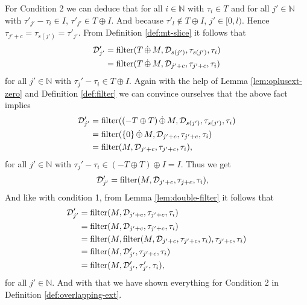 For Condition 2 we can deduce that for all $i \in \mathbb{N}$ with $\tau_i \in T$ and for all $j' \in \mathbb{N}$ with $\tau'_{j'} - \tau_i \in I$, $\tau'_{j'} \in T \oplus I$.
And because $\tau'_l \not\in T \oplus I$, $j' \in [0,l)$.
Hence $\tau_{j'+c} = \tau_{s(j')} = \tau'_{j'}$.
From Definition \ref{def:mt-slice} it follows that
\begin{align*}
    \mathcal{D}'_{j'}
    & = \operatorname{filter}(T \,\dot{\oplus}\, M, \mathcal{D}_{s(j')}, \tau_{s(j')}, \tau_i) \\
    & = \operatorname{filter}(T \,\dot{\oplus}\, M, \mathcal{D}_{j'+c}, \tau_{j'+c}, \tau_i) \\
\end{align*}
for all $j' \in \mathbb{N}$ with $\tau_j' - \tau_i \in T \oplus I$.
Again with the help of Lemma \ref{lem:oplusext-zero} and Definition \ref{def:filter} we can convince ourselves that the above fact implies
\begin{align*}
    \mathcal{D}'_{j'}
    & = \operatorname{filter}((-T \oplus T) \,\dot{\oplus}\, M, \mathcal{D}_{s(j')}, \tau_{s(j')}, \tau_i) \\
    & = \operatorname{filter}(\{0\} \,\dot{\oplus}\, M, \mathcal{D}_{j'+c}, \tau_{j'+c}, \tau_i) \\
    & = \operatorname{filter}(M, \mathcal{D}_{j'+c}, \tau_{j'+c}, \tau_i), 
\end{align*}
for all $j' \in \mathbb{N}$ with $\tau_j' - \tau_i \in (-T \oplus T) \oplus I = I$.
Thus we get
\begin{align*}
    \mathcal{D}'_{j'}
    & = \operatorname{filter}(M, \mathcal{D}_{j'+c}, \tau_{j+c}, \tau_i), 
\end{align*}
And like with condition 1, from Lemma \ref{lem:double-filter} it follows that
\begin{align*}
    \mathcal{D}'_{j'}
    & = \operatorname{filter}(M, \mathcal{D}_{j'+c}, \tau_{j'+c}, \tau_i)\\
    & = \operatorname{filter}(M, \mathcal{D}_{j'+c}, \tau_{j'+c}, \tau_i)\\ 
    & = \operatorname{filter}(M, \operatorname{filter}(M, \mathcal{D}_{j'+c}, \tau_{j'+c}, \tau_i), \tau_{j'+c}, \tau_i) \\
    & = \operatorname{filter}(M, \mathcal{D}'_{j'}, \tau_{j'+c}, \tau_i) \\
    & = \operatorname{filter}(M, \mathcal{D}'_{j'}, \tau'_{j'}, \tau_i),\\
\end{align*}
for all $j' \in \mathbb{N}$.
And with that we have shown everything for Condition 2 in Definition \ref{def:overlapping-ext}.